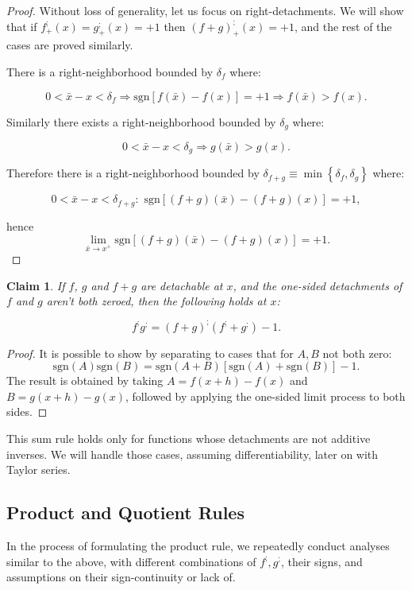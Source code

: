 \documentclass[11pt]{book}
\newtheorem{clm}[thm]{Claim}
\begin{document}
\begin{proof}Without loss of generality, let us focus on right-detachments. We will show that if $f^{;}_{+}\left(x\right)=g^{;}_{+}\left(x\right)=+1$ then $\left(f+g\right)^{;}_{+}\left(x\right)=+1$, and the rest of the cases are proved similarly.

There is a right-neighborhood bounded by $\delta_{f}$ where:

$$0<\bar{x}-x<\delta_{f}\Longrightarrow \text{sgn}\left[f\left(\bar{x}\right)-f\left(x\right)\right]=+1\Longrightarrow f\left(\bar{x}\right) > f\left(x\right).$$

Similarly there exists a right-neighborhood bounded by $\delta_{g}$ where:

$$0<\bar{x}-x<\delta_{g}\Longrightarrow g\left(\bar{x}\right) > g\left(x\right).$$

Therefore there is a right-neighborhood bounded by $\delta_{f+g}\equiv\min\left\{ \delta_{f},\delta_{g}\right\}$ where:

$$0<\bar{x}-x<\delta_{f+g}:\,\, \text{sgn}\left[\left(f+g\right)\left(\bar{x}\right)-\left(f+g\right)\left(x\right)\right]=+1,$$

hence $$\underset{\bar{x}\rightarrow x^{+}}{\lim}\text{sgn}\left[\left(f+g\right)\left(\bar{x}\right)-\left(f+g\right)\left(x\right)\right]=+1.$$\end{proof}

\begin{clm}If $f$, $g$ and $f+g$ are detachable at $x$, and the one-sided detachments of $f$ and $g$ aren’t both zeroed, then the following holds at $x$:

$$f^{;}g^{;}=\left(f+g\right)^{;}\left(f^{;}+g^{;}\right)-1.$$
\end{clm}

\begin{proof}It is possible to show by separating to cases that for $A,B$ not both zero:$$\text{sgn}\left(A\right)\text{sgn}\left(B\right)=\text{sgn}\left(A+B\right)\left[\text{sgn}\left(A\right)+\text{sgn}\left(B\right)\right]-1.$$The result is obtained by taking $A=f\left(x+h\right)-f\left(x\right)$ and $B=g\left(x+h\right)-g\left(x\right)$, followed by applying the one-sided limit process to both sides.
\end{proof}

This sum rule holds only for functions whose detachments are not additive inverses. We will handle those cases, assuming differentiability, later on with Taylor series.

\subsection{Product and Quotient Rules}
In the process of formulating the product rule, we repeatedly conduct analyses similar to the above, with different combinations of $f^{;},g^{;}$, their signs, and assumptions on their sign-continuity or lack of.
\end{document}
